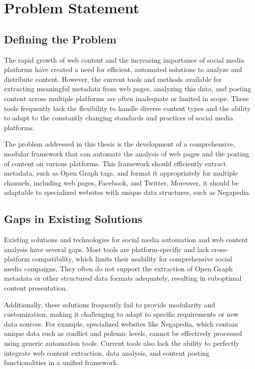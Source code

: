 \section{Problem Statement}
\label{sec:problem_statement}

\subsection{Defining the Problem}
\label{subsec:defining_the_problem}
The rapid growth of web content and the increasing importance of social media platforms have created a need for efficient, automated solutions to analyze and distribute content. However, the current tools and methods available for extracting meaningful metadata from web pages, analyzing this data, and posting content across multiple platforms are often inadequate or limited in scope. These tools frequently lack the flexibility to handle diverse content types and the ability to adapt to the constantly changing standards and practices of social media platforms.

The problem addressed in this thesis is the development of a comprehensive, modular framework that can automate the analysis of web pages and the posting of content on various platforms. This framework should efficiently extract metadata, such as Open Graph tags, and format it appropriately for multiple channels, including web pages, Facebook, and Twitter. Moreover, it should be adaptable to specialized websites with unique data structures, such as Negapedia.

\subsection{Gaps in Existing Solutions}
\label{subsec:gaps_in_existing_solutions}
Existing solutions and technologies for social media automation and web content analysis have several gaps. Most tools are platform-specific and lack cross-platform compatibility, which limits their usability for comprehensive social media campaigns. They often do not support the extraction of Open Graph metadata or other structured data formats adequately, resulting in suboptimal content presentation.

Additionally, these solutions frequently fail to provide modularity and customization, making it challenging to adapt to specific requirements or new data sources. For example, specialized websites like Negapedia, which contain unique data such as conflict and polemic levels, cannot be effectively processed using generic automation tools. Current tools also lack the ability to perfectly integrate web content extraction, data analysis, and content posting functionalities in a unified framework.

